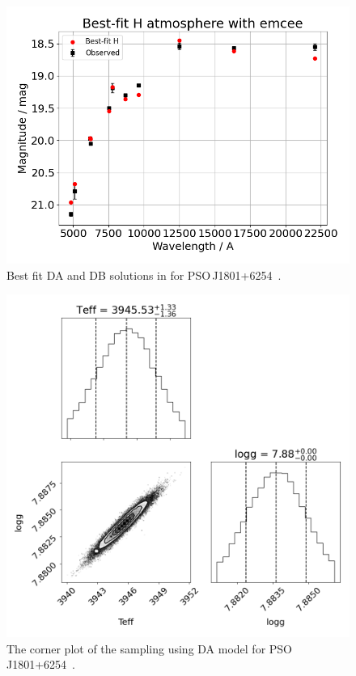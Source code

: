 \documentclass[fleqn,usenatbib]{rasti}
\begin{document}
\begin{figure}
    \centering
    \includegraphics[width=\columnwidth]{PSOJ1801p6254_emcee.png}
    \caption{Best fit DA and DB solutions in for PSO\,J1801+6254~\citep{2020MNRAS.493.6001L}.}
    \label{fig:best_fit}
\end{figure}

\begin{figure}
    \centering
    \includegraphics[width=\columnwidth]{PSOJ1801p6254_emcee_corner.png}
    \caption{The corner plot of the sampling using DA model for PSO\,J1801+6254~\citep{2020MNRAS.493.6001L}.}
    \label{fig:emcee_corner}
\end{figure}
\end{document}
